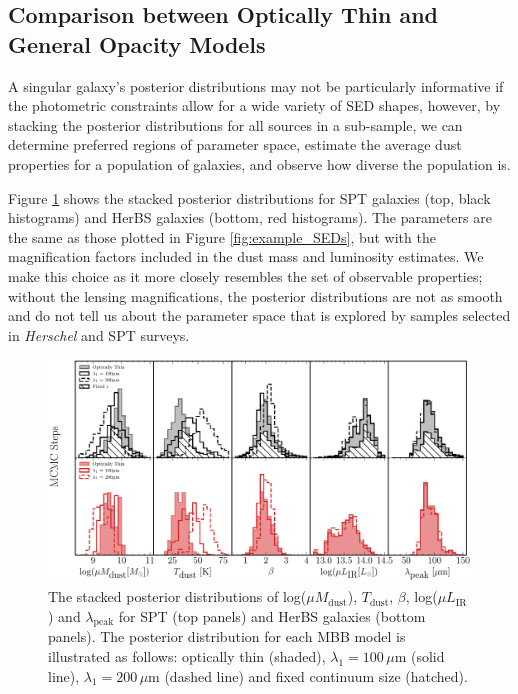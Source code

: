 \subsection{Comparison between Optically Thin and General Opacity Models}
\label{sec:comparison_optically_thin_and_general_opacity}

A singular galaxy's posterior distributions may not be particularly informative if the photometric constraints allow for a wide variety of SED shapes, however, by stacking the posterior distributions for all sources in a sub-sample, we can determine preferred regions of parameter space, estimate the average dust properties for a population of galaxies, and observe how diverse the population is. 

Figure \ref{fig:stacked_posteriors} shows the stacked posterior distributions for SPT galaxies (top, black histograms) and HerBS galaxies (bottom, red histograms). The parameters are the same as those plotted in Figure \ref{fig:example_SEDs}, but with the magnification factors included in the dust mass and luminosity estimates. We make this choice as it more closely resembles the set of observable properties; without the lensing magnifications, the posterior distributions are not as smooth and do not tell us about the parameter space that is explored by samples selected in \textit{Herschel} and SPT surveys.

\begin{figure}
	\centering
	\includegraphics[width=\columnwidth]{Figures/Figure_4_5.pdf}
	\caption[Stacked posterior distributions for each MBB model]{The stacked posterior distributions of log($\mu M_{\textrm{dust}}$), $T_{\textrm{dust}}$, $\beta$, log($\mu L_{\textrm{IR}}$) and $\lambda_{\textrm{peak}}$ for SPT (top panels) and HerBS galaxies (bottom panels). The posterior distribution for each MBB model is illustrated as follows: optically thin (shaded), $\lambda_1 = 100\,\mu$m (solid line), $\lambda_1 = 200\,\mu$m (dashed line) and fixed continuum size (hatched).}
	\label{fig:stacked_posteriors}
\end{figure}

